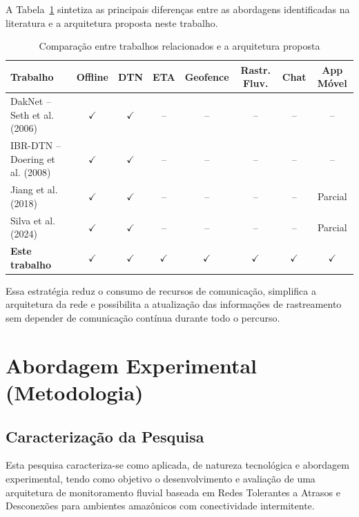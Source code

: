 \documentclass[12pt]{article}
\begin{document}
A Tabela~\ref{tab:relacionados} sintetiza as principais diferenças entre as abordagens identificadas na literatura e a arquitetura proposta neste trabalho.

\begin{table}[H]
\caption{Comparação entre trabalhos relacionados e a arquitetura proposta}
\label{tab:relacionados}
\centering
\renewcommand{\arraystretch}{1.25}
\begin{tabularx}{\textwidth}{Xccccccc}
\toprule
\textbf{Trabalho} & \textbf{Offline} & \textbf{DTN} & \textbf{ETA} & \textbf{Geofence} & \textbf{Rastr. Fluv.} & \textbf{Chat} & \textbf{App Móvel} \\
\midrule
DakNet -- Seth et al. (2006)     & $\checkmark$ & $\checkmark$ & --           & --           & --           & --           & --           \\
IBR-DTN -- Doering et al. (2008) & $\checkmark$ & $\checkmark$ & --           & --           & --           & --           & --           \\
Jiang et al. (2018)              & $\checkmark$ & $\checkmark$ & --           & --           & --           & --           & Parcial      \\
Silva et al. (2024)              & $\checkmark$ & $\checkmark$ & --           & --           & --           & --           & Parcial      \\
\midrule
\textbf{Este trabalho}           & $\checkmark$ & $\checkmark$ & $\checkmark$ & $\checkmark$ & $\checkmark$ & $\checkmark$ & $\checkmark$ \\
\bottomrule
\end{tabularx}
\end{table}

Essa estratégia reduz o consumo de recursos de comunicação, simplifica a arquitetura da rede e possibilita a atualização das informações de rastreamento sem depender de comunicação contínua durante todo o percurso.

\section{Abordagem Experimental (Metodologia)}
\subsection{Caracterização da Pesquisa}
Esta pesquisa caracteriza-se como aplicada, de natureza tecnológica e abordagem experimental, tendo como objetivo o desenvolvimento e avaliação de uma arquitetura de monitoramento fluvial baseada em Redes Tolerantes a Atrasos e Desconexões para ambientes amazônicos com conectividade intermitente.
\end{document}
